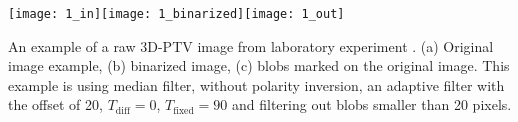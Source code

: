 %
%
%

\begin{frame}
\begin{card}
\centering
\texttt{[image: 1\_in]}\texttt{[image: 1\_binarized]}\texttt{[image: 1\_out]}
\end{card}
\vspace{-.5cm}
\begin{cardTiny}
An example of a raw 3D-PTV image from laboratory experiment \cite{Kreizer2011}. (a) Original image example, (b) binarized image, (c) blobs marked on the original image. This example is using median filter, without polarity inversion, an adaptive filter with the offset of 20, $T_\mathrm{diff} = 0$, $T_\mathrm{fixed} = 90$ and filtering out blobs smaller than 20 pixels.  
\end{cardTiny}
\end{frame}


